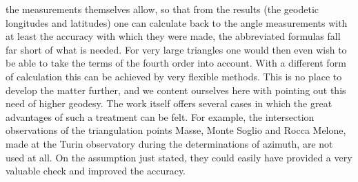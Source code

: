 %
the measurements themselves allow, so that from the results (the geodetic longitudes and latitudes) one can calculate back to the angle measurements with at least the accuracy with which they were made, the abbreviated formulas fall far short of what is needed. For very large triangles one would then even wish to be able to take the terms of the fourth order into account. With a different form of calculation this can be achieved by very flexible methods. This is no place to develop the matter further, and we content ourselves here with pointing out this need of higher geodesy. The work itself offers several cases in which the great advantages of such a treatment can be felt. For example, the intersection observations of the triangulation points Masse, Monte Soglio and Rocca Melone, made at the Turin observatory during the determinations of azimuth, are not used at all. On the assumption just stated, they could easily have provided a very valuable check and improved the accuracy.

